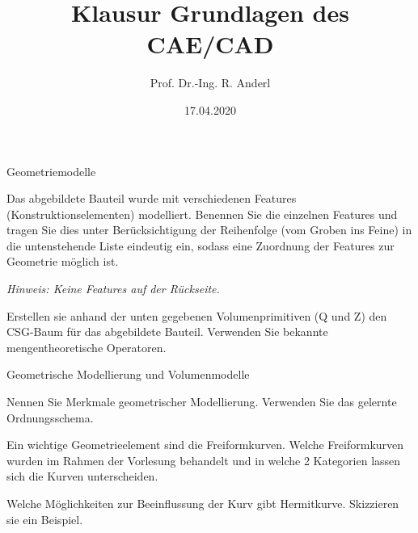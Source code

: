 \documentclass[
	ngerman,
	color = black,
	]{tudaexercise}
\begin{document}
\title[Übung TUDaExercise]{Klausur Grundlagen des CAE/CAD}
\author{Prof. Dr.-Ing. R. Anderl}
\date{17.04.2020}

\maketitle

\begin{task}[credit=13 P]{Geometriemodelle}
	\begin{subtask}[credit=4 P]
		Das abgebildete Bauteil wurde mit verschiedenen Features (Konstruktionselementen) modelliert.
		Benennen Sie die einzelnen Features und tragen Sie dies unter Berücksichtigung der Reihenfolge (vom Groben ins Feine) in die untenstehende Liste eindeutig ein, sodass eine Zuordnung der Features zur Geometrie möglich ist.
		
		\textit{Hinweis: Keine Features auf der Rückseite.} %
	\end{subtask}
	
	\begin{subtask}[credit=9 P]
		Erstellen sie anhand der unten gegebenen Volumenprimitiven (Q und Z) den CSG-Baum für das abgebildete Bauteil.
		Verwenden Sie bekannte mengentheoretische Operatoren.
	\end{subtask}

	
\end{task}

\begin{task}[credit=21 P]{Geometrische Modellierung und Volumenmodelle}
	\begin{subtask}[credit=6 P]
		Nennen Sie Merkmale geometrischer Modellierung.
		Verwenden Sie das gelernte Ordnungsschema.
	\end{subtask}
	
	\begin{subtask}[credit=2{,}5 P]
		Ein wichtige Geometrieelement sind die Freiformkurven.
		Welche Freiformkurven wurden im Rahmen der Vorlesung behandelt und in welche 2 Kategorien lassen sich die Kurven unterscheiden.
	\end{subtask}
	
	\begin{subtask}[credit=1{,}5 P]
		Welche Möglichkeiten zur Beeinflussung der Kurv gibt Hermitkurve.
		Skizzieren sie ein Beispiel.
	\end{subtask}
	
	\begin{subtask}[credit=6 P]
		
	\end{subtask}
	
	\begin{subtask}[credit=5 P]
		
	\end{subtask}
	
\end{task}
\end{document}
